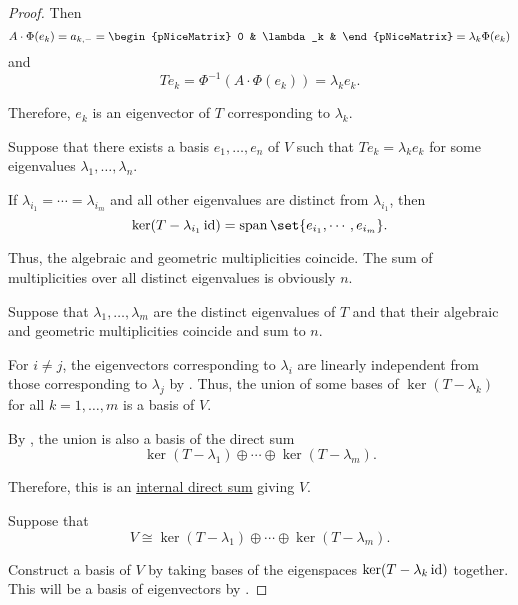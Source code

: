\begin{proof}
  Then
  \begin{equation*}
    A \cdot \Phi(e_k) = a_{k,\anon*} = \begin{pNiceMatrix} 0 & \lambda_k & \end{pNiceMatrix} = \lambda_k \Phi(e_k)
  \end{equation*}
  and
  \begin{equation*}
    T e_k = \Phi^{-1}(A \cdot \Phi(e_k)) = \lambda_k e_k.
  \end{equation*}

  Therefore, \( e_k \) is an eigenvector of \( T \) corresponding to \( \lambda_k \).

   Suppose that there exists a basis \( e_1, \ldots, e_n \) of \( V \) such that \( Te_k = \lambda_k e_k \) for some eigenvalues \( \lambda_1, \ldots, \lambda_n \).

  If \( \lambda_{i_1} = \cdots = \lambda_{i_m} \) and all other eigenvalues are distinct from \( \lambda_{i_1} \), then
  \begin{equation*}
    \ker(T - \lambda_{i_1} \id) = \linspan\set{ e_{i_1}, \cdots, e_{i_m} }.
  \end{equation*}

  Thus, the algebraic and geometric multiplicities coincide. The sum of multiplicities over all distinct eigenvalues is obviously \( n \).

   Suppose that \( \lambda_1, \ldots, \lambda_m \) are the distinct eigenvalues of \( T \) and that their algebraic and geometric multiplicities coincide and sum to \( n \).

  For \( i \neq j \), the eigenvectors corresponding to \( \lambda_i \) are linearly independent from those corresponding to \( \lambda_j \) by . Thus, the union of some bases of \( \ker(T - \lambda_k) \) for all \( k = 1, \ldots, m \) is a basis of \( V \).

  By , the union is also a basis of the direct sum
  \begin{equation*}
    \ker(T - \lambda_1) \oplus \cdots \oplus \ker(T - \lambda_m).
  \end{equation*}

  Therefore, this is an \hyperref[def:semimodule_direct_sum]{internal direct sum} giving \( V \).

   Suppose that
  \begin{equation*}
    V \cong \ker(T - \lambda_1) \oplus \cdots \oplus \ker(T - \lambda_m).
  \end{equation*}

  Construct a basis of \( V \) by taking bases of the eigenspaces \( \ker(T - \lambda_k \operatorname{id}) \) together. This will be a basis of eigenvectors by .
\end{proof}

